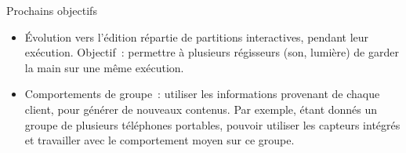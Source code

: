 \begin{block}{Prochains objectifs}
	\begin{itemize}
		\item Évolution vers l'édition répartie de partitions interactives, pendant leur exécution. Objectif~: permettre à plusieurs régisseurs (son, lumière) de garder la main sur une même exécution.
		\item Comportements de groupe~: utiliser les informations provenant de chaque client, pour générer de nouveaux contenus. Par exemple, étant donnés un groupe de  plusieurs téléphones portables, pouvoir utiliser les capteurs intégrés et travailler avec le comportement moyen sur ce groupe.
	\end{itemize}
\end{block}